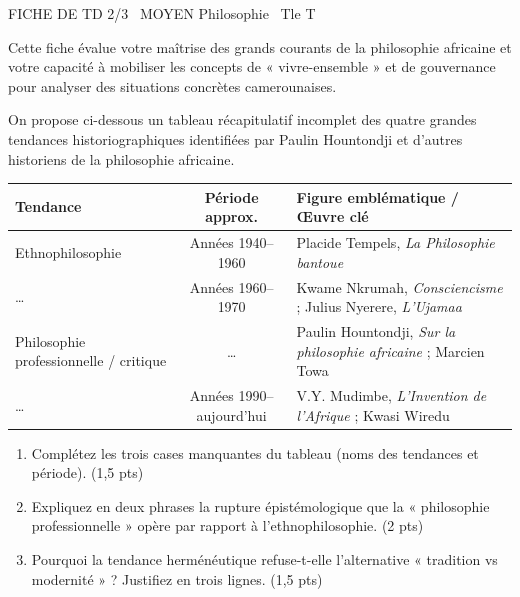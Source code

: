 \documentclass[11pt]{article}
\begin{document}
\begin{tcolorbox}[enhanced,colback=popink,colframe=popink,arc=10pt,boxrule=0pt,left=12pt,right=12pt,top=9pt,bottom=9pt]
{\color{white}\popxbold\small FICHE DE TD 2/3 \textbullet\ MOYEN \hfill Philosophie \textbullet\ Tle T\par}
\end{tcolorbox}
\vspace{4pt}
Cette fiche évalue votre maîtrise des grands courants de la philosophie africaine et votre capacité à mobiliser les concepts de « vivre-ensemble » et de gouvernance pour analyser des situations concrètes camerounaises.

\begin{exercice}
On propose ci-dessous un tableau récapitulatif incomplet des quatre grandes tendances historiographiques identifiées par Paulin Hountondji et d'autres historiens de la philosophie africaine.

\begin{tabularx}{\linewidth}{|X|c|X|}
\hline
\textbf{Tendance} & \textbf{Période approx.} & \textbf{Figure emblématique / Œuvre clé} \\
\hline
Ethnophilosophie & Années 1940--1960 & Placide Tempels, \textit{La Philosophie bantoue} \\
\hline
\ldots & Années 1960--1970 & Kwame Nkrumah, \textit{Consciencisme} ; Julius Nyerere, \textit{L'Ujamaa} \\
\hline
Philosophie professionnelle / critique & \ldots & Paulin Hountondji, \textit{Sur la philosophie africaine} ; Marcien Towa \\
\hline
\ldots & Années 1990--aujourd'hui & V.Y. Mudimbe, \textit{L'Invention de l'Afrique} ; Kwasi Wiredu \\
\hline
\end{tabularx}

\begin{enumerate}
\item Complétez les trois cases manquantes du tableau (noms des tendances et période). \hfill (1,5 pts)
\item Expliquez en deux phrases la rupture épistémologique que la « philosophie professionnelle » opère par rapport à l'ethnophilosophie. \hfill (2 pts)
\item Pourquoi la tendance herménéutique refuse-t-elle l'alternative « tradition vs modernité » ? Justifiez en trois lignes. \hfill (1,5 pts)
\end{enumerate}
\end{exercice}
\end{document}
